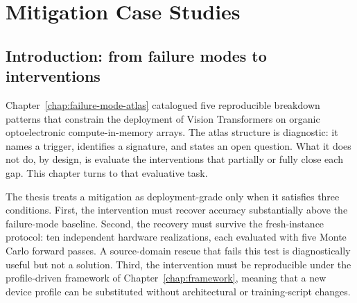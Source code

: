 %
%

\chapter{Mitigation Case Studies}
\label{chap:mitigation-case-studies}

\section{Introduction: from failure modes to interventions}

Chapter~\ref{chap:failure-mode-atlas} catalogued five reproducible breakdown patterns that constrain the deployment of Vision Transformers on organic optoelectronic compute-in-memory arrays. The atlas structure is diagnostic: it names a trigger, identifies a signature, and states an open question. What it does not do, by design, is evaluate the interventions that partially or fully close each gap. This chapter turns to that evaluative task.

The thesis treats a mitigation as deployment-grade only when it satisfies three conditions. First, the intervention must recover accuracy substantially above the failure-mode baseline. Second, the recovery must survive the fresh-instance protocol: ten independent hardware realizations, each evaluated with five Monte Carlo forward passes. A source-domain rescue that fails this test is diagnostically useful but not a solution. Third, the intervention must be reproducible under the profile-driven framework of Chapter~\ref{chap:framework}, meaning that a new device profile can be substituted without architectural or training-script changes.

